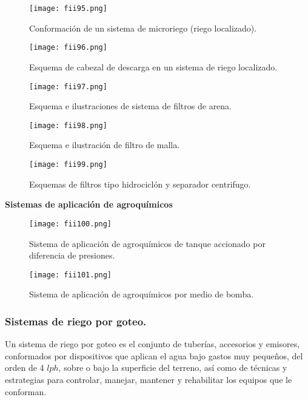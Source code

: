 \begin{figure}[h!]
	\centerline{\texttt{[image: fii95.png]}}
	\caption{Conformación de un sistema de microriego (riego localizado).}
	\label{fii95}
\end{figure}

\begin{figure}[h!]
	\centerline{\texttt{[image: fii96.png]}}
	\caption{Esquema de cabezal de descarga en un sistema de riego localizado.}
	\label{fii96}
\end{figure}

\begin{figure}[h!]
	\centerline{\texttt{[image: fii97.png]}}
	\caption{Esquema e ilustraciones de sistema de filtros de arena.}
	\label{fii97}
\end{figure}

\begin{figure}[h!]
	\centerline{\texttt{[image: fii98.png]}}
	\caption{Esquema e ilustración de filtro de malla.}
	\label{fii98}
\end{figure}

\begin{figure}[h!]
	\centerline{\texttt{[image: fii99.png]}}
	\caption{Esquemas de filtros tipo hidrociclón y separador centrifugo.}
	\label{fii99}
\end{figure}


\textbf{Sistemas de aplicación de agroquímicos}

\begin{figure}[h!]
	\centerline{\texttt{[image: fii100.png]}}
	\caption{Sistema de aplicación de agroquímicos de tanque accionado por diferencia de presiones.}
	\label{fii100}
\end{figure}

\begin{figure}[h!]
	\centerline{\texttt{[image: fii101.png]}}
	\caption{Sistema de aplicación de agroquímicos por medio de bomba.}
	\label{fii101}
\end{figure}


\subsubsection{Sistemas de riego por goteo.}
Un sistema de riego por goteo es el conjunto de tuberías, accesorios y emisores,
conformados por dispositivos que aplican el agua bajo gastos muy pequeños, del orden
de 4 $lph$, sobre o bajo la superficie del terreno, así como de técnicas y estrategias para
controlar, manejar, mantener y rehabilitar los equipos que le conforman.

